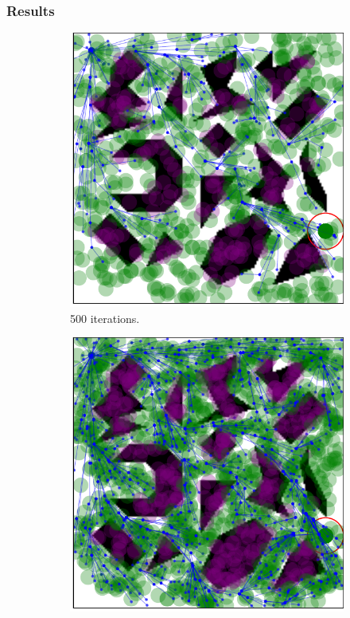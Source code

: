 \documentclass{beamer}
\begin{document}
\begin{frame}
	\frametitle{Results}	
	\begin{figure}
		\centering
		\begin{subfigure}[b]{0.32\textwidth}
		  \includegraphics[width=\textwidth]{figChap5/Maze_clutter_RRTstarML_learning500.pdf}  
		  \caption{500 iterations.}
		\end{subfigure}  
		\begin{subfigure}[b]{0.32\textwidth}
		  \includegraphics[width=\textwidth]{figChap5/Maze_clutter_RRTstarML_learning1000.pdf}  

\end{subfigure}
\end{figure}
\end{frame}
\end{document}
